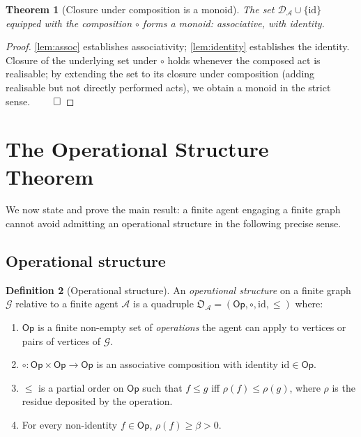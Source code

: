 \documentclass[11pt,a4paper]{article}
\theoremstyle{thmstyle}
\newtheorem{theorem}{Theorem}[section]
\theoremstyle{definition}
\newtheorem{definition}[theorem]{Definition}
\theoremstyle{remark}
\newcommand{\Graph}{\mathcal{G}}
\newcommand{\Agent}{\mathcal{A}}
\newcommand{\Op}{\mathsf{Op}}
\newcommand{\Res}{\rho}
\newcommand{\floor}{\beta}
\newcommand{\OpStr}{\mathfrak{O}}
\begin{document}
\begin{theorem}[Closure under composition is a monoid]
\label{thm:monoid}
The set $\mathcal{D}_\Agent \cup \{\mathrm{id}\}$ equipped with the
composition $\circ$ forms a monoid: associative, with identity.
\end{theorem}

\begin{proof}
\cref{lem:assoc} establishes associativity; \cref{lem:identity}
establishes the identity. Closure of the underlying set under
$\circ$ holds whenever the composed act is realisable; by extending
the set to its closure under composition (adding realisable but
not directly performed acts), we obtain a monoid in the strict
sense. $\qed$
\end{proof}

\section{The Operational Structure Theorem}
\label{sec:main}

We now state and prove the main result: a finite agent engaging a
finite graph cannot avoid admitting an operational structure in the
following precise sense.

\subsection{Operational structure}

\begin{definition}[Operational structure]
\label{def:opstr}
An \emph{operational structure} on a finite graph $\Graph$ relative
to a finite agent $\Agent$ is a quadruple
$\OpStr_\Agent = (\Op, \circ, \mathrm{id}, \leq)$ where:
\begin{enumerate}[label=(O\arabic*),leftmargin=2.6em,nosep]
\item\label{O:set} $\Op$ is a finite non-empty set of
\emph{operations} the agent can apply to vertices or pairs of
vertices of $\Graph$.
\item\label{O:monoid} $\circ: \Op \times \Op \to \Op$ is an
associative composition with identity $\mathrm{id} \in \Op$.
\item\label{O:order} $\leq$ is a partial order on $\Op$ such that
$f \leq g$ iff $\Res(f) \leq \Res(g)$, where $\Res$ is the residue
deposited by the operation.
\item\label{O:floor} For every non-identity $f \in \Op$,
$\Res(f) \geq \floor > 0$.
\end{enumerate}
\end{definition}
\end{document}
